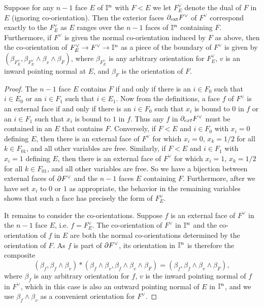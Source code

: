 \begin{lemma}\label{L: ext faces}
Suppose for any $n-1$ face $E$ of $\mathbb{I}^n$ with $F<E$ we let $F_E^\vee$ denote the dual of $F$ in $E$ (ignoring co-orientation). Then the exterior faces $\partial_{\text{ext}}F^\vee$ of $F^\vee$ correspond exactly to the $F_E^\vee$ as $E$ ranges over the $n-1$ faces of $\mathbb{I}^n$ containing $F$. Furthermore, if $F^\vee$ is given the normal co-orientation induced by $F$ as above, then the co-orientation of $F^\vee_E\to F^\vee\to \mathbb{I}^n$ as a piece of the boundary of $F^\vee$ is given by $(\beta_{F_E^\vee},\beta_{F_E^\vee}\wedge\beta_v\wedge \beta_F)$, where $\beta_{F_E^\vee}$ is any arbitrary orientation for $F_E^\vee$, $v$ is an inward pointing normal at $E$, and $\beta_F$ is the orientation of $F$.
\end{lemma}
\begin{proof}
The $n-1$ face  $E$ contains $F$ if and only if there is an $i\in F_0$ such that $i\in E_0$ or an $i\in F_1$ such that $i\in E_1$. Now from the definitions, a face $f$ of $F^\vee$ is an external face if and only if there is an $i\in F_0$ such that $x_i$ is bound to $0$ in $f$ or an $i\in F_1$ such that $x_i$ is bound to $1$ in $f$. Thus any $f$ in $\partial_{ext}F^\vee$ must be contained in an $E$ that contains $F$. Conversely, if $F<E$ and $i\in F_0$ with $x_i=0$ defining $E$, then there is an external face of $F^\vee$ for which $x_i=0$, $x_k=1/2$ for all $k\in F_{01}$, and all other variables are free. Similarly, if $F<E$ and $i\in F_1$ with $x_i=1$ defining $E$, then there is an external face of $F^\vee$ for which $x_i=1$, $x_k=1/2$ for all $k\in F_{01}$, and all other variables are free. So we have a bijection between external faces of $\partial F^\vee$ and the $n-1$ faces $E$ containing $F$. Furthermore, after we have set $x_i$ to $0$ or $1$ as appropriate, the behavior in the remaining variables shows that such a face has precisely the form of $F^\vee_E$.

It remains to consider the co-orientations. Suppose $f$ is an external face of $F^\vee$ in the $n-1$ face $E$, i.e. $f=F^\vee_E$. The co-orientation of $F^\vee$ in $\mathbb{I}^n$ and the co-orientation of $f$ in $E$ are both the normal co-orientations determined by the orientation of $F$. As $f$ is part of $\partial F^\vee$, its orientation in $\mathbb{I}^n$ is therefore the composite $$(\beta_f,\beta_f\wedge\beta_v)*(\beta_f\wedge\beta_v,\beta_f\wedge\beta_v\wedge \beta_F)=(\beta_f,\beta_f\wedge\beta_v\wedge \beta_F),$$ where $\beta_f$ is any arbitrary orientation for $f$, $v$ is the inward pointing normal of $f$ in $F^\vee$, which in this case is also an outward pointing normal of $E$ in $\mathbb{I}^n$, and we use $\beta_f\wedge\beta_v$ as a convenient orientation for $F^\vee$.
\end{proof}


